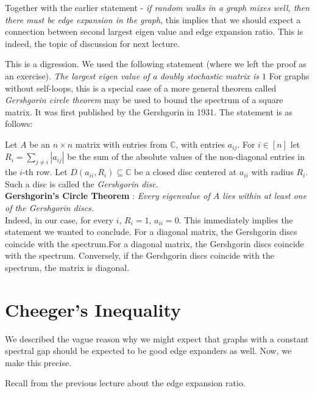 Together with the earlier statement - \textit{if random walks in a graph mixes well, then there must be edge expansion in the graph}, this implies that we should expect a connection between second largest eigen value and edge expansion ratio. This is indeed, the topic of discussion for next lecture.


\begin{curiousity}
This is a digression. We used the following statement (where we left the proof as an exercise).
\textit{The largest eigen value of a doubly stochastic matrix is $1$ }
For graphs without self-loops, this is a special case of a more general theorem called \textit{Gershgorin circle theorem} may be used to bound the spectrum of a square matrix. It was first published by the Gershgorin in 1931. The statement is as follows:

Let $A$ be an $n \times n$ matrix with entries from $\mathbb{C}$, 
with entries $a_{ij}$. For $i \in [n]$ let $R_{i}=\sum _{j\neq i}\left|a_{ij}\right|$ be the sum of the absolute values of the non-diagonal entries in the $i$-th row. Let $D(a_{ii},R_{i}) \subseteq \mathbb{C}$ be a closed disc centered at $a_{ii}$ with radius $R_{i}$. Such a disc is called the \textit{Gershgorin disc}.\\[-4mm]

\noindent \textbf{Gershgorin's Circle Theorem} : \textit{Every eigenvalue of $A$ lies within at least one of the Gershgorin discs.}\\[-4mm]

\noindent Indeed, in our case, for every $i$, $R_i = 1$, $a_{ii} = 0$. This immediately implies the statement we wanted to conclude.
For a diagonal matrix, the Gershgorin discs coincide with the spectrum.For a diagonal matrix, the Gershgorin discs coincide with the spectrum. Conversely, if the Gershgorin discs coincide with the spectrum, the matrix is diagonal.
\end{curiousity}

\section{Cheeger's Inequality}

We described the vague reason why we might expect that graphs with a constant spectral gap should be expected to be good edge expanders as well. Now, we make this precise.

Recall from the previous lecture about the edge expansion ratio.


